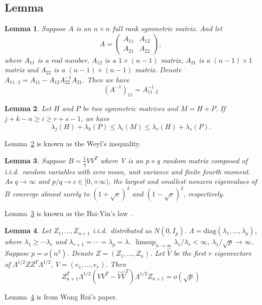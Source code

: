\documentclass[review]{elsarticle}
\theoremstyle{plain}
\newtheorem{lemma}{Lemma}
\theoremstyle{definition}
\theoremstyle{remark}
\begin{document}
\subsection{Lemma}

\begin{lemma}\label{matrixInv}
    Suppose $A$ is an $n\times n$ full rank symmetric matrix. And let 
    \begin{equation*}
        A=\begin{pmatrix}
            A_{11} & A_{12}\\
            A_{21} & A_{22}
        \end{pmatrix},
    \end{equation*}
    where $A_{11}$ is a real number, $A_{12}$ is a $1\times (n-1)$ matrix, $A_{21}$ is a $(n-1)\times 1$ matrix and $A_{22}$ is a $(n-1)\times (n-1)$ matrix. Denote $A_{11\cdot 2}=A_{11}-A_{12}A_{22}^{-1}A_{21}$. Then we have
    \begin{equation*}
        {(A^{-1})}_{11}=A_{11\cdot 2}^{-1}
    \end{equation*}
\end{lemma}

\begin{lemma}\label{Weyl}
Let $H$ and $P$ be two symmetric matrices and $M=H+P$. If $j+k-n\geq i\geq r+s-1$, we have
    \begin{equation*}
        \lambda_j (H)+\lambda_k(P)\leq \lambda_i (M)\leq \lambda_r (H)+\lambda_s(P).
    \end{equation*}
\end{lemma}
Lemma~\ref{Weyl} is known as the Weyl's inequality.

\begin{lemma}\label{baiyin}
    Suppose $B=\frac{1}{q}V V^T$ where V is an $p\times q$ random matrix composed of i.i.d.\  random variables with zero mean, unit variance and finite fourth moment.
    As $q\to \infty$ and $p/q \to c\in [0,+\infty)$, the largest and smallest nonzero eigenvalues of $B$ converge almost surely to ${(1+\sqrt{c})}^2$ and ${(1-\sqrt{c})}^2$, respectively.
\end{lemma}
Lemma~\ref{baiyin} is known as the Bai-Yin's law~\cite{Bai1993Limit}.

\begin{lemma}\label{wangPCA}
    Let $Z_1,\ldots,Z_{n+1}$ i.i.d.\ distributed as $N(0,I_p)$.
    $\Lambda=\textrm{diag}(\lambda_1,\ldots,\lambda_p)$, where $\lambda_1\geq \cdots \lambda_r$ and $\lambda_{r+1}=\cdots =\lambda_p=\lambda$.
    $\limsup_{n\to \infty} \lambda_1/\lambda_r<\infty$, $\lambda_1/\sqrt{p}\to \infty$.
    Suppose $p=o(n^2)$.
    Denote $Z=(Z_1,\ldots,Z_n)$. Let $\hat{V}$ be the first $r$ eigenvectors of $\Lambda^{1/2}Z Z^T\Lambda^{1/2}$, $V=(e_1,\ldots,e_r)$. Then
    \begin{equation*}
        Z_{n+1}^T \Lambda^{1/2}(VV^T -\hat{V}\hat{V}^T)\Lambda^{1/2}Z_{n+1}=o(\sqrt{p})
    \end{equation*}
\end{lemma}
Lemma~\ref{wangPCA} is from Wang Rui's paper.
\end{document}
